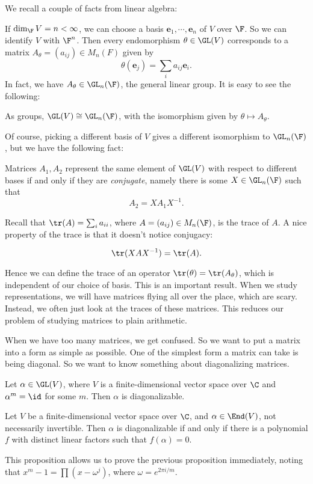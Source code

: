 \documentclass[a4paper]{article}
\begin{document}
We recall a couple of facts from linear algebra:

If $\dim_\F V = n < \infty$, we can choose a basis $\mathbf{e}_1, \cdots, \mathbf{e}_n$ of $V$ over $\F$. So we can identify $V$ with $\F^n$. Then every endomorphism $\theta \in \GL(V)$ corresponds to a matrix $A_\theta = (a_{ij}) \in M_n(F)$ given by
\[
  \theta(\mathbf{e}_j) = \sum_i a_{ij} \mathbf{e}_i.
\]
In fact, we have $A_\theta \in \GL_n(\F)$, the general linear group. It is easy to see the following:
\begin{prop}
  As groups, $\GL(V) \cong \GL_n(\F)$, with the isomorphism given by $\theta \mapsto A_\theta$.
\end{prop}

Of course, picking a different basis of $V$ gives a different isomorphism to $\GL_n(\F)$, but we have the following fact:
\begin{prop}
  Matrices $A_1, A_2$ represent the same element of $\GL(V)$ with respect to different bases if and only if they are \emph{conjugate}, namely there is some $X \in \GL_n(\F)$ such that
  \[
    A_2 = XA_1 X^{-1}.
  \]
\end{prop}

Recall that $\tr(A) = \sum_i a_{ii}$, where $A = (a_{ij}) \in M_n(\F)$, is the trace of $A$. A nice property of the trace is that it doesn't notice conjugacy:
\begin{prop}
  \[
    \tr(XAX^{-1}) = \tr (A).
  \]
\end{prop}

Hence we can define the trace of an operator $\tr(\theta) = \tr(A_\theta)$, which is independent of our choice of basis. This is an important result. When we study representations, we will have matrices flying all over the place, which are scary. Instead, we often just look at the traces of these matrices. This reduces our problem of studying matrices to plain arithmetic.

When we have too many matrices, we get confused. So we want to put a matrix into a form as simple as possible. One of the simplest form a matrix can take is being diagonal. So we want to know something about diagonalizing matrices.

\begin{prop}
  Let $\alpha \in \GL(V)$, where $V$ is a finite-dimensional vector space over $\C$ and $\alpha^m = \id$ for some $m$. Then $\alpha$ is diagonalizable.
\end{prop}

\begin{prop}
  Let $V$ be a finite-dimensional vector space over $\C$, and $\alpha \in \End(V)$, not necessarily invertible. Then $\alpha$ is diagonalizable if and only if there is a polynomial $f$ with distinct linear factors such that $f(\alpha) = 0$.
\end{prop}
This proposition allows us to prove the previous proposition immediately, noting that $x^m - 1 = \prod(x - \omega^j)$, where $\omega = e^{2\pi i/m}$.
\end{document}
